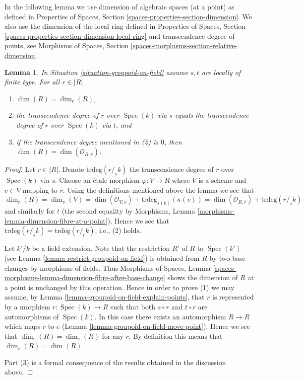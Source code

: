 \documentclass{stacks-project}
\theoremstyle{plain}
\newtheorem{lemma}[subsection]{Lemma}
\theoremstyle{definition}
\theoremstyle{remark}
\numberwithin{equation}{subsection}
\def\Spec{\mathop{\mathrm{Spec}}}
\begin{document}
\noindent
In the following lemma we use dimension of algebraic spaces (at a point)
as defined in
Properties of Spaces, Section \ref{spaces-properties-section-dimension}.
We also use the dimension of the local ring defined in
Properties of Spaces, Section
\ref{spaces-properties-section-dimension-local-ring}
and transcendence degree of points, see
Morphisms of Spaces, Section \ref{spaces-morphisms-section-relative-dimension}.

\begin{lemma}
\label{lemma-groupoid-on-field-locally-finite-type-dimension}
In
Situation \ref{situation-groupoid-on-field}
assume $s, t$ are locally of finite type.
For all $r \in |R|$
\begin{enumerate}
\item $\dim(R) = \dim_r(R)$,
\item the transcendence degree of $r$ over $\Spec(k)$
via $s$ equals the transcendence degree of $r$ over $\Spec(k)$
via $t$, and
\item if the transcendence degree mentioned in (2) is $0$, then
$\dim(R) = \dim(\mathcal{O}_{R, \overline{r}})$.
\end{enumerate}
\end{lemma}

\begin{proof}
Let $r \in |R|$. Denote $\text{trdeg}(r/_{\!\! s}k)$ the transcendence
degree of $r$ over $\Spec(k)$ via $s$. Choose an \'etale morphism
$\varphi : V \to R$ where $V$ is a scheme and $v \in V$ mapping to $r$.
Using the definitions mentioned above the lemma we see that
$$
\dim_r(R) = \dim_v(V) =
\dim(\mathcal{O}_{V, v}) + \text{trdeg}_{s(k)}(\kappa(v)) =
\dim(\mathcal{O}_{R, \overline{r}}) + \text{trdeg}(r/_{\!\! s}k)
$$
and similarly for $t$ (the second equality by
Morphisms, Lemma \ref{morphisms-lemma-dimension-fibre-at-a-point}).
Hence we see that $\text{trdeg}(r/_{\!\! s}k) = \text{trdeg}(r/_{\!\! t}k)$,
i.e., (2) holds.

\medskip\noindent
Let $k'/k$ be a field extension. Note that the restriction $R'$
of $R$ to $\Spec(k')$ (see
Lemma \ref{lemma-restrict-groupoid-on-field})
is obtained from $R$ by two base changes by morphisms of fields. Thus
Morphisms of Spaces,
Lemma \ref{spaces-morphisms-lemma-dimension-fibre-after-base-change}
shows the dimension of $R$ at a point is unchanged by this operation.
Hence in order to prove (1) we may assume, by
Lemma \ref{lemma-groupoid-on-field-explain-points},
that $r$ is represented by a morphism $r : \Spec(k) \to R$ such
that both $s \circ r$ and $t \circ r$ are automorphisms of $\Spec(k)$.
In this case there exists an automorphism $R \to R$ which maps $r$ to $e$
(Lemma \ref{lemma-groupoid-on-field-move-point}).
Hence we see that $\dim_r(R) = \dim_e(R)$ for any $r$. By definition this
means that $\dim_r(R) = \dim(R)$.

\medskip\noindent
Part (3) is a formal consequence of the results obtained in the discussion
above.
\end{proof}
\end{document}
